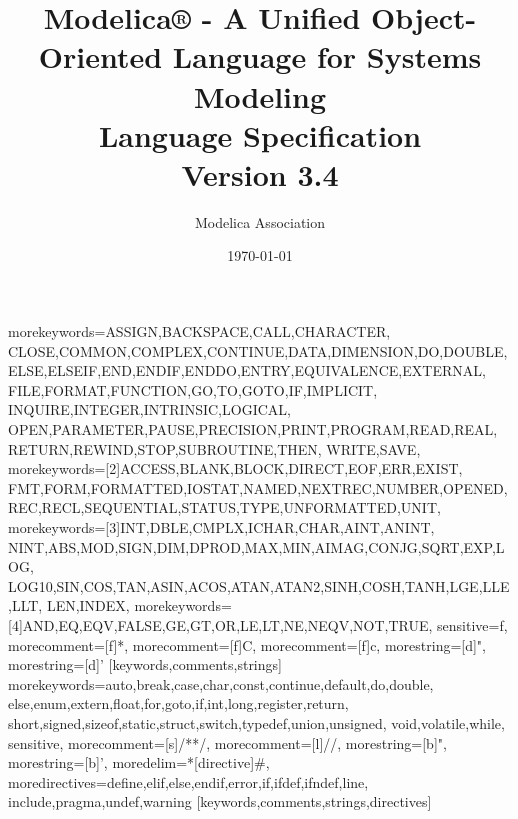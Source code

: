%
  {morekeywords={ASSIGN,BACKSPACE,CALL,CHARACTER,%
      CLOSE,COMMON,COMPLEX,CONTINUE,DATA,DIMENSION,DO,DOUBLE,%
      ELSE,ELSEIF,END,ENDIF,ENDDO,ENTRY,EQUIVALENCE,EXTERNAL,%
      FILE,FORMAT,FUNCTION,GO,TO,GOTO,IF,IMPLICIT,%
      INQUIRE,INTEGER,INTRINSIC,LOGICAL,%
      OPEN,PARAMETER,PAUSE,PRECISION,PRINT,PROGRAM,READ,REAL,%
      RETURN,REWIND,STOP,SUBROUTINE,THEN,%
      WRITE,SAVE},%
    morekeywords=[2]{ACCESS,BLANK,BLOCK,DIRECT,EOF,ERR,EXIST,%
      FMT,FORM,FORMATTED,IOSTAT,NAMED,NEXTREC,NUMBER,OPENED,%
      REC,RECL,SEQUENTIAL,STATUS,TYPE,UNFORMATTED,UNIT},%
    morekeywords=[3]{INT,DBLE,CMPLX,ICHAR,CHAR,AINT,ANINT,%
      NINT,ABS,MOD,SIGN,DIM,DPROD,MAX,MIN,AIMAG,CONJG,SQRT,EXP,LOG,%
      LOG10,SIN,COS,TAN,ASIN,ACOS,ATAN,ATAN2,SINH,COSH,TANH,LGE,LLE,LLT,%
      LEN,INDEX},%
    morekeywords=[4]{AND,EQ,EQV,FALSE,GE,GT,OR,LE,LT,NE,NEQV,NOT,TRUE},%
   sensitive=f,%
   morecomment=[f]*,%
   morecomment=[f]C,%
   morecomment=[f]c,%
   morestring=[d]",%
   morestring=[d]'%
  }[keywords,comments,strings]%
%
  {morekeywords={auto,break,case,char,const,continue,default,do,double,%
      else,enum,extern,float,for,goto,if,int,long,register,return,%
      short,signed,sizeof,static,struct,switch,typedef,union,unsigned,%
      void,volatile,while},%
   sensitive,%
   morecomment=[s]{/*}{*/},%
   morecomment=[l]//,%
   morestring=[b]",%
   morestring=[b]',%
   moredelim=*[directive]\#,%
   moredirectives={define,elif,else,endif,error,if,ifdef,ifndef,line,%
      include,pragma,undef,warning}%
  }[keywords,comments,strings,directives]%

\title{Modelica® - A Unified Object-Oriented Language for Systems
Modeling\\[2\baselineskip]Language
Specification\\[2\baselineskip]Version 3.4}
\date{\today}
\author{Modelica Association}